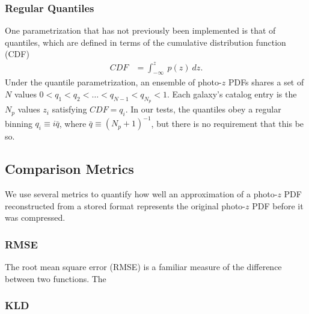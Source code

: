 \documentclass[\docopts]{\docclass}
\begin{document}
\subsubsection{Regular Quantiles}
\label{sec:quantiles}

One parametrization that has not previously been implemented is that of quantiles, which are defined in terms of the cumulative distribution function (CDF)
\begin{align}
  \label{eq:cdf}
  CDF &= \int_{-\infty}^{z}\ p(z)\ dz.
\end{align}
Under the quantile parametrization, an ensemble of photo-$z$ PDFs shares a set of $N$ values $0<q_{1}<q_{2}<\dots<q_{N-1}<q_{N_{p}}<1$.  Each galaxy's catalog entry is the $N_{p}$ values $z_{i}$ satisfying $CDF=q_{i}$.  In our tests, the quantiles obey a regular binning $q_{i}\equiv i\bar{q}$, where $\bar{q}\equiv(N_{p}+1)^{-1}$, but there is no requirement that this be so.

\subsection{Comparison Metrics}
\label{sec:metrics}


We use several metrics to quantify how well an approximation of a photo-$z$ PDF reconstructed from a stored format represents the original photo-$z$ PDF before it was compressed.



\subsubsection{RMSE}
\label{sec:rms}

The root mean square error (RMSE) is a familiar measure of the difference between two functions.  The

\subsubsection{KLD}
\label{sec:kld}
\end{document}
